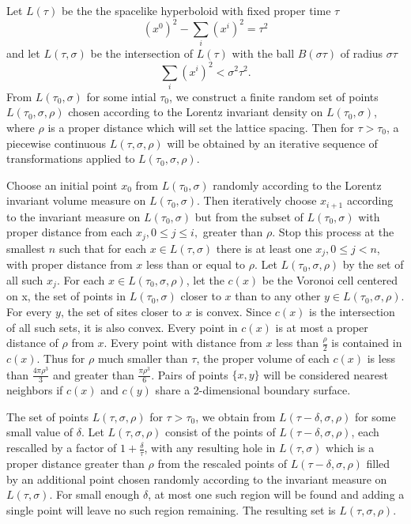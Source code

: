 \documentclass[twocolumn,amsmath,amssymb]{revtex4-1}
\begin{document}
Let $L(\tau)$ be the the spacelike hyperboloid with fixed proper time $\tau$
\begin{equation}
\label{hyperboloid}
(x^0)^2 - \sum_i (x^i)^ 2 =  \tau^2
\end{equation}
and let $L(\tau, \sigma)$ be
the intersection of $L(\tau)$ with the ball $B( \sigma \tau)$ of radius $\sigma \tau$
\begin{equation}
\label{sphere}
\sum_i (x^i)^2 <  \sigma^2 \tau^2.
\end{equation}
From $L(\tau_0, \sigma)$ for some intial $\tau_0$,
we construct a finite random set of points
$L( \tau_0, \sigma, \rho)$ chosen according to
the Lorentz invariant density on $L(\tau_0, \sigma)$,
where $\rho$ is a proper distance which will
set the lattice spacing.
Then for $\tau > \tau_0$, a piecewise continuous
$L( \tau, \sigma, \rho)$ 
will be obtained by an iterative sequence
of transformations applied to $L( \tau_0, \sigma, \rho)$.

Choose an initial point $x_0$ from $L(\tau_0, \sigma)$ randomly
according to 
the Lorentz invariant volume measure on $L(\tau_0, \sigma)$.
Then iteratively choose $x_{i+1}$
according to the invariant measure on $L(\tau_0, \sigma)$ but from the subset of $L(\tau_0, \sigma)$ with
proper distance from each $x_j, 0 \le j \le i,$ greater than $\rho$. Stop this process at the smallest $n$
such that for each $x \in L( \tau, \sigma)$ there is at least one $x_j, 0 \le j < n$, 
with proper distance from $x$ less than or equal to $\rho$. Let $L( \tau_0, \sigma, \rho)$ by the set
of all such $x_j$.
For each $x \in L( \tau_0, \sigma, \rho)$, let the $c(x)$ be the
Voronoi cell centered on x,
the set of points in $L(\tau_0, \sigma)$
closer to $x$ than to any other $y \in L( \tau_0, \sigma, \rho)$.
For every $y$, the set of sites closer to $x$ is convex. Since $c(x)$ is the intersection of
all such sets, it is also convex.
Every point in $c(x)$ is
at most a proper distance of $\rho$ from $x$. Every point with distance from $x$ less than
$\frac{\rho}{2}$ is contained in $c(x)$. Thus for $\rho$ much smaller than
$\tau$, the proper volume of
each $c(x)$ is less than $\frac{4 \pi \rho^3}{3}$ and greater than $\frac{\pi \rho^3}{6}$.
Pairs of points $\{x, y\}$ will
be considered nearest neighbors if $c(x)$ and $c(y)$ share a 2-dimensional boundary surface.

The set of points $L( \tau, \sigma, \rho)$ for $\tau > \tau_0$, we obtain from
$L( \tau - \delta, \sigma, \rho)$ for some small value of $\delta$.
Let $L( \tau, \sigma, \rho)$ consist of the points
of $L( \tau - \delta, \sigma, \rho)$,
each rescalled by a factor of $1 + \frac{\delta}{\tau}$,
with any resulting hole in $L(\tau, \sigma)$ 
which is a proper distance greater than $\rho$
from the rescaled points of $L( \tau - \delta, \sigma, \rho)$
filled by an additional
point chosen randomly according to the invariant measure on $L(\tau, \sigma)$.
For small enough $\delta$, at most one such region will be found and adding a
single point will leave no such region remaining. The resulting set is
$L(\tau, \sigma, \rho)$. 
\end{document}
